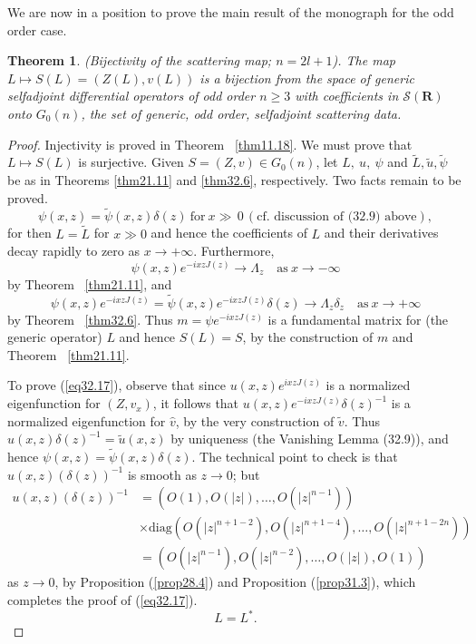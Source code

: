 \documentclass{surv-l}
\theoremstyle{plain}
\newtheorem{theorem}{Theorem}[section]
\theoremstyle{definition}
\numberwithin{equation}{chapter}
\begin{document}
We are now in a position to prove the main result of the monograph for the odd order case.

\setcounter{theorem}{15}
\begin{theorem}\label{thm32.16}
\emph{(Bijectivity of the scattering map; $n=2l+1$)}. The map $L\mapsto S(L)=(Z(L),v(L))$ is a bijection from the space of generic selfadjoint differential operators of odd order $n\geq 3$ with coefficients in $\mathscr{S}(\mathbf{R})$ onto $G_{0}(n)$, the set of generic, odd order, selfadjoint scattering data.
\end{theorem}

\begin{proof}
Injectivity is proved in Theorem ~\ref{thm11.18}. We must prove that $ L\mapsto S(L)$ is surjective. Given $S=(Z, v)\in G_{0}(n)$, let $L,\ u,\ \psi$ and $\tilde{L},\tilde{u},\tilde{\psi}$ be as in Theorems \ref{thm21.11} and \ref{thm32.6}, respectively. Two facts remain to be proved.
\setcounter{equation}{16}
\begin{equation}\label{eq32.17}
\psi(x,z) =\tilde{\psi}(x, z)\delta(z)\ \mathrm{for}\ x\gg\, 0\,(\text{cf. discussion of (32.9) above}),
\end{equation}
for then $L=\tilde{L}$ for $x\gg 0$ and hence the coefficients of $L$ and their derivatives decay rapidly to zero as $x \rightarrow+\infty$. Furthermore,
\begin{equation*}
\psi(x, z)e^{-ixzJ(z)}\rightarrow\Lambda_{z}\quad \mathrm{as}\  x\rightarrow-\infty
\end{equation*}
by Theorem ~\ref{thm21.11}, and
\begin{equation*}
\psi(x,z)e^{-ixzJ(z)}=\tilde{\psi}(x,z)e^{-ixzJ(z)}\delta(z)\rightarrow\Lambda_{z}\delta_{z}\quad \mathrm{as}\  x\rightarrow+\infty
\end{equation*}
by Theorem ~\ref{thm32.6}. Thus $m=\psi e^{-ixzJ(z)}$ is a fundamental matrix for (the generic operator) $L$ and hence $S(L)=S$, by the construction of $m$ and Theorem ~\ref{thm21.11}.

To prove (\ref{eq32.17}), observe that since $u(x,z)e^{ixzJ(z)}$ is a normalized eigenfunction for $(Z, v_{x})$, it follows that $u(x, z)e^{-ixzJ(z)}\delta(z)^{-1}$ is a normalized eigenfunction for $\hat{v}$, by the very construction of $\tilde{v}$. Thus $u(x, z)\delta(z)^{-1}=\tilde{u}(x, z)$ by uniqueness (the Vanishing Lemma (32.9)), and hence $\psi(x, z)=\tilde{\psi}(x, z)\delta(z)$. The technical point to check is that $u(x, z)(\delta(z))^{-1}$ is smooth as $z\rightarrow 0$; but
\begin{align*}
u(x, z)(\delta(z))^{-1}&=(O(1), O(|z|),\ldots,O(|z|^{n-1}))\\
&\times \mathrm{diag} (O(|z|^{n+1-2}),O(|z|^{n+1-4}),\ldots,O(|z|^{n+1-2n}))\\
&=(O(|z|^{n-1}), O(|z|^{n-2}),\ldots,O(|z|),O(1))
\end{align*}
as $z\rightarrow 0$, by Proposition (\ref{prop28.4}) and Proposition (\ref{prop31.3}), which completes the proof of (\ref{eq32.17}).
\setcounter{equation}{17}
\begin{equation}\label{eq32.18}
L=L^{*}.
\end{equation}


\end{proof}
\end{document}
